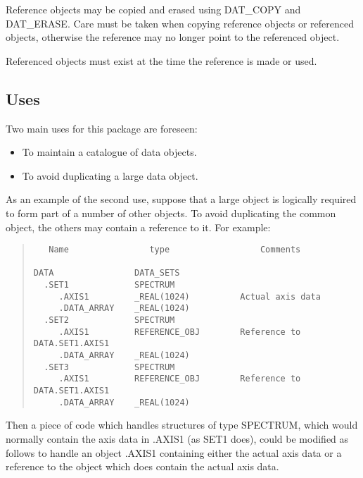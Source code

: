Reference objects may be copied and erased using DAT\_COPY and DAT\_ERASE\@.
Care must be taken when copying reference objects or referenced objects,
otherwise the reference may no longer point to the referenced object.

Referenced objects must exist at the time the reference is made or used.

\subsection{Uses}

Two main uses for this package are foreseen:
\begin{itemize}
\item To maintain a catalogue of data objects.
\item To avoid duplicating a large data object.
\end{itemize}
As an example of the second use, suppose that a large object is logically
required to form part of a number of other objects.
To avoid duplicating the common object, the others may contain a reference to
it.
For example:

\begin{quote}

\begin{small}
\begin{verbatim}
   Name                type                  Comments

DATA                DATA_SETS
  .SET1             SPECTRUM
     .AXIS1         _REAL(1024)          Actual axis data
     .DATA_ARRAY    _REAL(1024)
  .SET2             SPECTRUM
     .AXIS1         REFERENCE_OBJ        Reference to DATA.SET1.AXIS1
     .DATA_ARRAY    _REAL(1024)
  .SET3             SPECTRUM
     .AXIS1         REFERENCE_OBJ        Reference to DATA.SET1.AXIS1
     .DATA_ARRAY    _REAL(1024)
\end{verbatim}
\end{small}

\end{quote}
Then a piece of code which handles structures of type SPECTRUM, which would
normally contain the axis data in .AXIS1 (as SET1 does), could be modified as
follows to handle an object .AXIS1 containing either the actual axis data or
a reference to the object which does contain the actual axis data.

